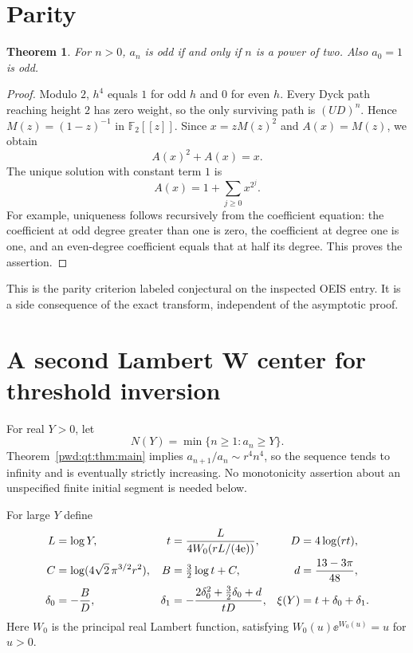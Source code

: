 \documentclass[11pt,letterpaper]{article}
\numberwithin{equation}{section}
\newtheorem{theorem}{Theorem}[section]
\theoremstyle{remark}\newtheorem{remark}[theorem]{Remark}
\begin{document}
\section{Parity}\label{pwd:qt:sec:parity}
\begin{theorem}\label{pwd:qt:thm:parity}
For $n>0$, $a_n$ is odd if and only if $n$ is a power of two. Also $a_0=1$ is odd.
\end{theorem}
\begin{proof}
Modulo $2$, $h^4$ equals $1$ for odd $h$ and $0$ for even $h$. Every Dyck path reaching height $2$ has zero weight, so the only surviving path is $(UD)^n$. Hence $M(z)=(1-z)^{-1}$ in $\mathbb F_2[[z]]$. Since $x=zM(z)^2$ and $A(x)=M(z)$, we obtain
\[
 A(x)^2+A(x)=x.
\]
The unique solution with constant term $1$ is
\[
 A(x)=1+\sum_{j\ge0}x^{2^j}.
\]
For example, uniqueness follows recursively from the coefficient equation: the coefficient at odd degree greater than one is zero, the coefficient at degree one is one, and an even-degree coefficient equals that at half its degree. This proves the assertion.
\end{proof}
This is the parity criterion labeled conjectural on the inspected OEIS entry. It is a side consequence of the exact transform, independent of the asymptotic proof.

\section{A second Lambert W center for threshold inversion}\label{pwd:qt:sec:inverse}
For real $Y>0$, let
\[
 N(Y)=\min\{n\ge1:a_n\ge Y\}.
\]
Theorem~\ref{pwd:qt:thm:main} implies $a_{n+1}/a_n\sim r^4n^4$, so the sequence tends to infinity and is eventually strictly increasing. No monotonicity assertion about an unspecified finite initial segment is needed below.

For large $Y$ define
\begin{align}\label{pwd:qt:eq:inverse-defs}
 L&=\log Y,&
 t&=\frac{L}{4W_0(rL/(4\mathrm e))},&D&=4\log(rt),\notag\\
 C&=\log(4\sqrt2\,\pi^{3/2}r^2),&
 B&=\tfrac32\log t+C,&d&=\frac{13-3\pi}{48},\\
 \delta_0&=-\frac BD,&
 \delta_1&=-\frac{2\delta_0^2+\tfrac32\delta_0+d}{tD},&
 \xi(Y)&=t+\delta_0+\delta_1.\notag
\end{align}
Here $W_0$ is the principal real Lambert function, satisfying $W_0(u)\ee^{W_0(u)}=u$ for $u>0$.
\end{document}
